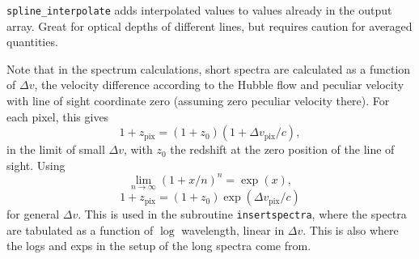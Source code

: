 \documentclass{report}
\newcommand{\param}[1]{{\tt #1}}
\begin{document}
\param{spline\_interpolate} adds interpolated values to values already in the output array. Great for optical depths of different lines, but requires caution for averaged quantities.  

Note that in the spectrum calculations, short spectra are calculated as a function of $\Delta v$, the velocity difference according to the Hubble flow and peculiar velocity with line of sight coordinate zero (assuming zero peculiar velocity there).
For each pixel, this gives 
\begin{equation}
1 + z_{\mathrm{pix}} = (1 + z_{0}) (1 + \Delta v_{\mathrm{pix}} / c),
\end{equation}
in the limit of small $\Delta v$, with $z_{0}$ the redshift at the zero position of the line of sight. Using 
\begin{equation}
\lim_{n \rightarrow \infty} \left(1 + x/n \right)^{n} = \exp(x),
\end{equation}  
\begin{equation}
1 + z_{\mathrm{pix}} = (1 + z_{0}) \exp(\Delta v_{\mathrm{pix}} / c)
\end{equation}
for general $\Delta v$. This is used in the subroutine \param{insertspectra}, where the spectra are tabulated as a function of $\log$ wavelength, linear in $\Delta v$. This is also where the logs and exps in the setup of the long spectra come from.
\end{document}

